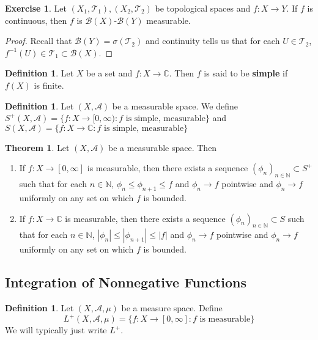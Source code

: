 \documentclass[12pt]{amsart}
\theoremstyle{definition}
\newtheorem{defn}[definition]{Definition}
\newtheorem{thm}[definition]{Theorem}
\newtheorem{ex}[definition]{Exercise}
\newcommand{\sig}{\sigma}
\newcommand{\C}{\mathbb{C}}
\newcommand{\N}{\mathbb{N}}
\newcommand{\MA}{\mathcal{A}}
\newcommand{\MB}{\mathcal{B}}
\newcommand{\MT}{\mathcal{T}}
\newcommand{\RG}{[0,\infty]}
\newcommand{\Rg}{[0,\infty)}
\newcommand{\lex}[1]{\label{ex:#1}}
\newcommand{\ld}[1]{\label{defn:#1}}
\begin{document}
	\begin{ex} \lex{00000} 
		Let $(X_1,\MT_1), (X_2,\MT_2)$ be topological spaces and $f: X \rightarrow Y$. If $f$ is continuous, then $f$ is $\MB(X)$-$\MB(Y)$ measurable.
	\end{ex}
	
	\begin{proof}
		Recall that $\MB(Y) = \sig(\MT_2)$ and continuity tells us that for each $U \in \MT_2$, $f^{-1}(U) \in \MT_1 \subset \MB(X)$. 
	\end{proof}
	
	\begin{defn} \ld{00000} 
		Let $X$ be a set and $f:X \rightarrow \C$. Then $f$ is said to be \textbf{simple} if $f(X)$ is finite.
	\end{defn}
	
	\begin{defn} \ld{00000} 
		Let $(X,\MA)$ be a measurable space. We define $S^+(X,\MA) = \{f:X \rightarrow \Rg: f \text{ is simple, measurable}\}$ and $S(X,\MA) = \{f: X \rightarrow \C: f \text{ is simple, measurable}\}$
	\end{defn}
	
	\begin{thm}
		Let $(X, \MA)$ be a measurable space. Then 
		\begin{enumerate}
			\item If $f: X \rightarrow \RG$ is measurable, then there exists a sequence $(\phi_n)_{n \in \N} \subset S^+$ such that for each $n \in \N$, $\phi_n \leq \phi_{n+1} \leq f$ and $\phi_n \rightarrow f$ pointwise and $\phi_n \rightarrow f$ uniformly on any set on which $f$ is bounded.
			
			\item If $f: X \rightarrow \C$ is measurable, then there exists a sequence $(\phi_n)_{n \in \N} \subset S$ such that for each $n \in \N$, $|\phi_n| \leq |\phi_{n+1}| \leq |f|$ and $\phi_n \rightarrow f$ pointwise and $\phi_n \rightarrow f$ uniformly on any set on which $f$ is bounded.
		\end{enumerate}
	\end{thm}
	
	\newpage
	
	\subsection{Integration of Nonnegative Functions}
	
	\begin{defn} \ld{00000} 
		Let $(X, \MA, \mu)$ be a measure space. Define $$L^{+}(X, \MA, \mu) = \{f:X \rightarrow \RG : f \text{ is measurable}\}$$ We will typically just write $L^{+}$.
	\end{defn}
	
\end{document}
